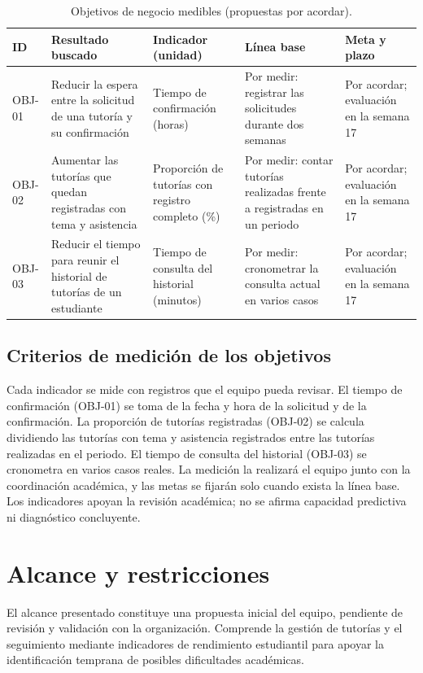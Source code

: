 \documentclass[11pt,a4paper]{article}
\begin{document}
\begin{table}[ht]
\centering
\small
\caption{Objetivos de negocio medibles (propuestas por acordar).}
\label{tab:objetivos}
\begin{tabularx}{\textwidth}{|l|X|X|X|X|}
\hline
\textbf{ID} & \textbf{Resultado buscado} & \textbf{Indicador (unidad)} & \textbf{Línea base} & \textbf{Meta y plazo} \\ \hline
OBJ-01 & Reducir la espera entre la solicitud de una tutoría y su confirmación & Tiempo de confirmación (horas) & Por medir: registrar las solicitudes durante dos semanas & Por acordar; evaluación en la semana 17 \\ \hline
OBJ-02 & Aumentar las tutorías que quedan registradas con tema y asistencia & Proporción de tutorías con registro completo (\%) & Por medir: contar tutorías realizadas frente a registradas en un periodo & Por acordar; evaluación en la semana 17 \\ \hline
OBJ-03 & Reducir el tiempo para reunir el historial de tutorías de un estudiante & Tiempo de consulta del historial (minutos) & Por medir: cronometrar la consulta actual en varios casos & Por acordar; evaluación en la semana 17 \\ \hline
\end{tabularx}
\end{table}


\subsection{Criterios de medición de los objetivos}

Cada indicador se mide con registros que el equipo pueda revisar. El tiempo de confirmación (OBJ-01) se toma de la fecha y hora de la solicitud y de la confirmación. La proporción de tutorías registradas (OBJ-02) se calcula dividiendo las tutorías con tema y asistencia registrados entre las tutorías realizadas en el periodo. El tiempo de consulta del historial (OBJ-03) se cronometra en varios casos reales. La medición la realizará el equipo junto con la coordinación académica, y las metas se fijarán solo cuando exista la línea base. Los indicadores apoyan la revisión académica; no se afirma capacidad predictiva ni diagnóstico concluyente.

\section{Alcance y restricciones}

El alcance presentado constituye una propuesta inicial
del equipo, pendiente de revisión y validación con la
organización. Comprende la gestión de tutorías y el
seguimiento mediante indicadores de rendimiento estudiantil
para apoyar la identificación temprana de posibles
dificultades académicas.
\end{document}
